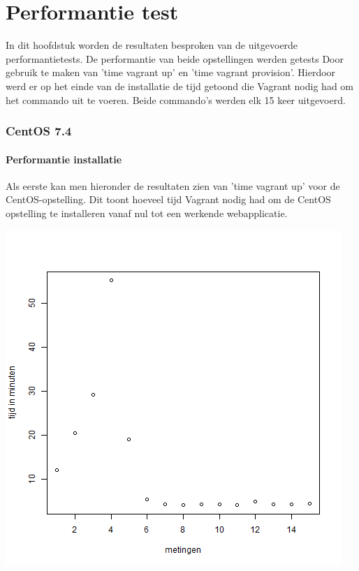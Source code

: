 
\chapter{Performantie test}
\label{ch:performantietest}

In dit hoofdstuk worden de resultaten besproken van de uitgevoerde performantietests. De performantie van beide opstellingen werden getests Door gebruik te maken van 'time vagrant up' en 'time vagrant provision'. Hierdoor werd er op het einde van de installatie de tijd getoond die Vagrant nodig had om het commando uit te voeren. Beide commando's werden elk 15 keer uitgevoerd.

\subsection{CentOS 7.4}

\subsubsection{Performantie installatie}
Als eerste kan men hieronder de resultaten zien van 'time vagrant up' voor de CentOS-opstelling. Dit toont hoeveel tijd Vagrant nodig had om de CentOS opstelling te installeren vanaf nul tot een werkende webapplicatie.

\begin{center}
	\includegraphics[scale=0.5]{img/centosplotfull.png}
\end{center}

